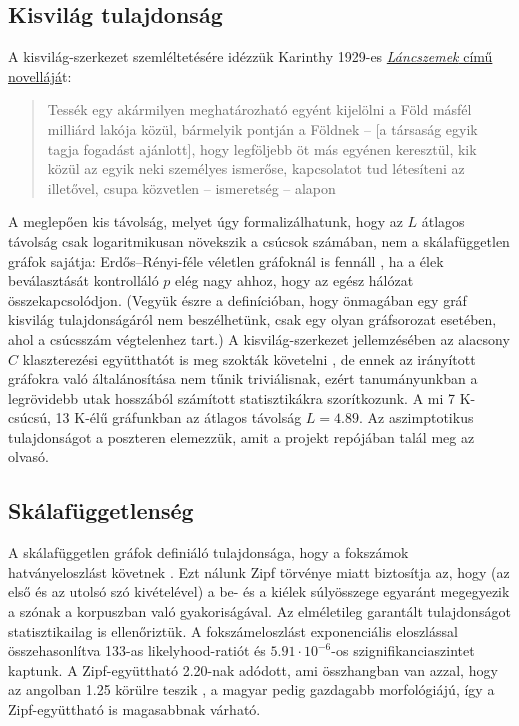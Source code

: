 \documentclass{llncs}
\begin{document}
\subsection{Kisvilág tulajdonság}

A kisvilág-szerkezet szemléltetésére idézzük Karinthy 1929-es
\href{http://www.irodalmijelen.hu/05242013-1547/karinthy-frigyes-lancszemek}{\emph{Láncszemek}
című novellájá}t:

\begin{quote}
  Tessék egy akármilyen meghatározható egyént kijelölni a Föld másfél milliárd
  lakója közül, bármelyik pontján a Földnek – [a társaság egyik tagja fogadást
  ajánlott], hogy legföljebb öt más egyénen keresztül, kik közül az egyik neki
  személyes ismerőse, kapcsolatot tud létesíteni az illetővel, csupa közvetlen
  – ismeretség – alapon
\end{quote}

A meglepően kis távolság, melyet úgy formalizálhatunk, hogy az $L$ átlagos
távolság csak logaritmikusan növekszik a csúcsok számában, nem a
skálafüggetlen gráfok sajátja: Erdős--Rényi-féle véletlen gráfoknál is fennáll
\cite{erdos1960evolution}, ha a élek beválasztását kontrolláló $p$ elég nagy
ahhoz, hogy az egész hálózat összekapcsolódjon. (Vegyük észre a definícióban,
hogy önmagában egy gráf kisvilág tulajdonságáról nem beszélhetünk, csak egy
olyan gráfsorozat esetében, ahol a csúcsszám végtelenhez tart.) A kisvilág-szerkezet jellemzésében az alacsony $C$
klaszterezési együtthatót is meg szokták követelni \cite{watts1998collective},
de ennek az irányított gráfokra való általánosítása nem tűnik triviálisnak,
ezért tanumányunkban  a legrövidebb utak hosszából számított statisztikákra
szorítkozunk.  A mi 7 K-csúcsú, 13 K-élű gráfunkban az átlagos távolság
$L=4.89$. Az aszimptotikus tulajdonságot a poszteren elemezzük, amit a projekt
repójában talál meg az olvasó.

\subsection{Skálafüggetlenség}

A skálafüggetlen gráfok definiáló tulajdonsága, hogy a fokszámok
hatványeloszlást követnek \cite{barabasi1999emergence}. Ezt nálunk Zipf
törvénye miatt biztosítja az, hogy (az első és az utolsó szó kivételével) a be-
és a kiélek súlyösszege egyaránt megegyezik a szónak a korpuszban való
gyakoriságával.  Az elméletileg garantált tulajdonságot statisztikailag is
ellenőriztük.  A fokszámeloszlást exponenciális eloszlással összehasonlítva
133-as likelyhood-ratiót és $5.91\cdot 10^{-6}$-os szignifikanciaszintet
kaptunk. A Zipf-együttható 2.20-nak adódott, ami összhangban van azzal, hogy az
angolban 1.25 körülre teszik \cite{Kornai:2008}, a magyar pedig gazdagabb
morfológiájú, így a Zipf-együttható is magasabbnak várható.
\end{document}
